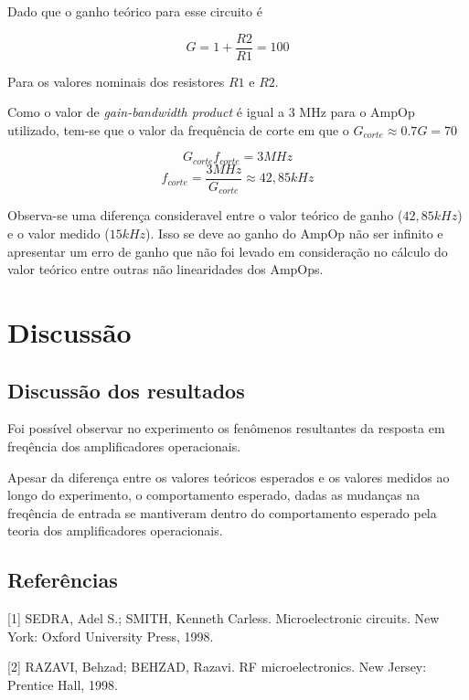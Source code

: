 \documentclass{abntex2}
\begin{document}
Dado que o ganho teórico para esse circuito é

\[G = 1+\frac{R2}{R1} = 100\]

Para os valores nominais dos resistores $R1$ e $R2$.

Como o valor de \emph{gain-bandwidth product} é igual a 3 MHz para o AmpOp utilizado, tem-se que o valor da frequência de corte em que o $G_{corte} \approx 0.7 G = 70$

\[G_{corte}f_{corte} = 3MHz\]
\[f_{corte} = \frac{3MHz}{G_{corte}} \approx 42,85kHz\]

Observa-se uma diferença consideravel entre o valor teórico de ganho ($42,85 kHz$) e o valor medido ($15 kHz$). Isso se deve ao ganho do AmpOp não ser infinito e apresentar um erro de ganho que não foi levado em consideração no cálculo do valor teórico entre outras não linearidades dos AmpOps.


\chapter{Discussão}

\section{Discussão dos resultados}

Foi possível observar no experimento os fenômenos resultantes da resposta em freqência dos amplificadores operacionais.

Apesar da diferença entre os valores teóricos esperados e os valores medidos ao longo do experimento, o comportamento esperado, dadas as mudanças na freqência de entrada se mantiveram dentro do comportamento esperado pela teoria dos amplificadores operacionais.

\clearpage

\section*{Referências}

[1] SEDRA, Adel S.; SMITH, Kenneth Carless. Microelectronic circuits. New York: Oxford University Press, 1998.

[2] RAZAVI, Behzad; BEHZAD, Razavi. RF microelectronics. New Jersey: Prentice Hall, 1998.
\end{document}
